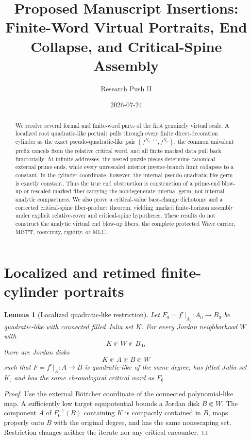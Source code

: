 \documentclass[11pt]{article}
\title{Proposed Manuscript Insertions:\\Finite-Word Virtual Portraits, End Collapse, and Critical-Spine Assembly}
\author{Research Push II}
\date{2026-07-24}
\newtheorem{lemma}[theorem]{Lemma}
\theoremstyle{definition}
\theoremstyle{remark}
\begin{document}
\maketitle

\begin{abstract}
We resolve several formal and finite-word parts of the first genuinely virtual scale.  A localized root quadratic-like portrait pulls through every finite direct-decoration cylinder as the exact pseudo-quadratic-like pair $(f^{N_w+r},f^{N_w})$; the common univalent prefix cancels from the relative critical word, and all finite marked data pull back functorially.  At infinite addresses, the nested puzzle pieces determine canonical external prime ends, while every unrescaled interior inverse-branch limit collapses to a constant.  In the cylinder coordinate, however, the internal pseudo-quadratic-like germ is exactly constant.  Thus the true end obstruction is construction of a prime-end blow-up or rescaled marked fiber carrying the nondegenerate internal germ, not internal analytic compactness.  We also prove a critical-value base-change dichotomy and a corrected critical-spine fiber-product theorem, yielding marked finite-horizon assembly under explicit relative-cover and critical-spine hypotheses.  These results do not construct the analytic virtual end blow-up fibers, the complete protected Wave carrier, MBTT, coercivity, rigidity, or MLC.
\end{abstract}

\section{Localized and retimed finite-cylinder portraits}

\begin{lemma}[Localized quadratic-like restriction]\label{lem:localize}
Let $F_0=f^r|_{A_0}:A_0\to B_0$ be quadratic-like with connected filled Julia set $K$.  For every Jordan neighborhood $W$ with
\[
 K\Subset W\Subset B_0,
\]
there are Jordan disks
\[
 K\Subset A\Subset B\Subset W
\]
such that $F=f^r|_A:A\to B$ is quadratic-like of the same degree, has filled Julia set $K$, and has the same chronological critical word as $F_0$.
\end{lemma}

\begin{proof}
Use the external B\"ottcher coordinate of the connected polynomial-like map.  A sufficiently low target equipotential bounds a Jordan disk $B\Subset W$.  The component $A$ of $F_0^{-1}(B)$ containing $K$ is compactly contained in $B$, maps properly onto $B$ with the original degree, and has the same nonescaping set.  Restriction changes neither the iterate nor any critical encounter.
\end{proof}
\end{document}
